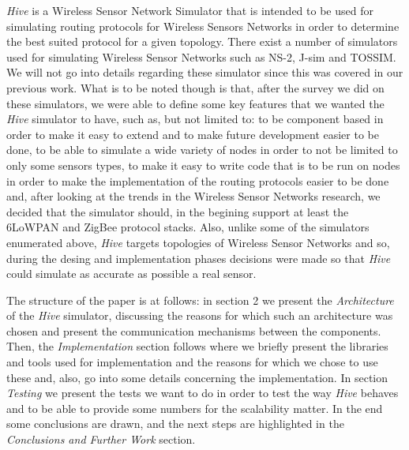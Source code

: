 \textit{Hive} is a Wireless Sensor Network Simulator that is intended to be
used for simulating routing protocols for Wireless Sensors Networks in order
to determine the best suited protocol for a given topology.
There exist a number of simulators used for simulating Wireless Sensor
Networks such as NS-2, J-sim\cite{jsim-article} and TOSSIM\cite{tossim}. We will not go into details regarding
these simulator since this was covered in our previous work. What is to be
noted though is that, after the survey we did on these simulators, we were able
to define some key features that we wanted the \textit{Hive} simulator to
have, such as, but not limited to: to be component based in order to make it easy to extend and to make future development easier to
be done, to be able to simulate a wide variety of nodes in order to not be
limited to only some sensors types, to make it easy to write code that is to
be run on nodes in order to make the implementation of the routing protocols
easier to be done and, after looking at the trends in the Wireless Sensor
Networks research, we decided that the simulator should, in the begining
support at least the 6LoWPAN and ZigBee protocol stacks.
Also, unlike some of the simulators enumerated above, \textit{Hive} targets topologies of Wireless Sensor
Networks and so, during the desing and implementation phases decisions were
made so that \textit{Hive} could simulate as accurate as possible a real
sensor.

The structure of the paper is at follows: in section 2 we present the
\textit{Architecture} of the \textit{Hive} simulator, discussing the reasons for which such
an architecture was chosen and present the communication mechanisms between
the components. Then, the \textit{Implementation} section follows where we briefly present
the libraries and tools used for implementation and the reasons for which we
chose to use these and, also, go into some details concerning the implementation.
In section \textit{Testing} we present the tests we want to do in
order to test the way \textit{Hive} behaves and to be able to provide some
numbers for the scalability matter.
In the end some conclusions are drawn, and the next steps are highlighted in
the \textit{Conclusions and Further Work} section. 
